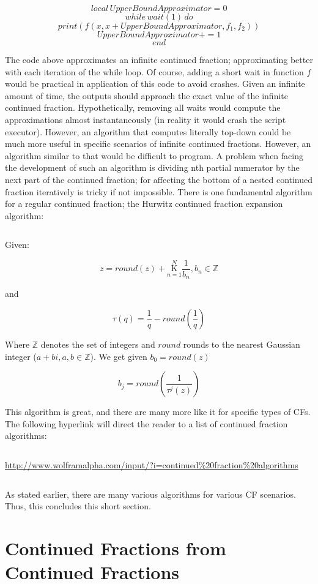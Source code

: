 \documentclass{article}
\begin{document}
$$local \, UpperBoundApproximator = 0$$
$$while \, wait(1) \, do$$
$$print(f(x,x+UpperBoundApproximator, f_1, f_2))$$
$$UpperBoundApproximator += 1$$
$$end$$

The code above approximates an infinite continued fraction; approximating better with each iteration of the while loop. Of course, adding a short wait in function $f$ would be practical in application of this code to avoid crashes. Given an infinite amount of time, the outputs should approach the exact value of the infinite continued fraction. Hypothetically, removing all waits would compute the approximations almost instantaneously (in reality it would crash the script executor). However, an algorithm that computes literally top-down could be much more useful in specific scenarios of infinite continued fractions. However, an algorithm similar to that would be difficult to program. A problem when facing the development of such an algorithm is dividing nth partial numerator by the next part of the continued fraction; for affecting the bottom of a nested continued fraction iteratively is tricky if not impossible. There is one fundamental algorithm for a regular continued fraction; the Hurwitz continued fraction expansion algorithm:

$${}$$

Given:

$$z=round(z)+\underset{n=1}{\overset{N}{ \mathrm K}} \frac{1}{b_n} , b_n \in \mathbb{Z}$$

and

$$\tau(q)=\frac{1}{q}-round(\frac{1}{q})$$

Where $\mathbb{Z}$ denotes the set of integers and $round$ rounds to the nearest Gaussian integer ($a+bi, a,b \in \mathbb{Z}$). We get given $b_0=round(z)$

$$b_j=round(\frac{1}{\tau^j(z)})$$

This algorithm is great, and there are many more like it for specific types of CFs. The following hyperlink will direct the reader to a list of continued fraction algorithms:

$${}$$

\url{http://www.wolframalpha.com/input/?i=continued%20fraction%20algorithms}

$${}$$

As stated earlier, there are many various algorithms for various CF scenarios. Thus, this concludes this short section.

\section{Continued Fractions from Continued Fractions}
\end{document}
